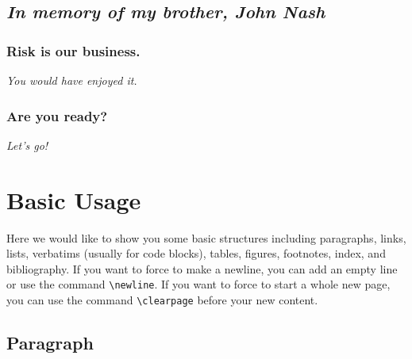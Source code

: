 \documentclass[10pt, a4paper, oneside]{book}
\begin{document}
\puredocTitlepageDate{\today}
\puredocTitlepageMaketitle[left]
\setcounter{page}{2}

{
\pagestyle{empty}
\vspace*{1cm}
\section*{\centering \emph{In memory of my brother, John Nash}}
\subsection*{\centering Risk is our business.}

{\centering \emph{You would have enjoyed it.} \par}


\subsection*{\centering Are you ready?}

{\centering \emph{Let's go!} \par}


\clearpage
}

\setcounter{tocdepth}{3}
{ \hypersetup{hidelinks} \tableofcontents } \clearpage
{ \hypersetup{hidelinks} \listoftables } \clearpage
{ \hypersetup{hidelinks} \listoffigures } \clearpage

\chapter{Basic Usage}\label{basic-usage}

Here we would like to show you some basic structures
including paragraphs, links, lists, verbatims (usually for code blocks),
tables, figures, footnotes, index, and bibliography.
If you want to force to make a newline, you can add an empty line or use the command \texttt{\textbackslash{}newline}.
If you want to force to start a whole new page, you can use the command \texttt{\textbackslash{}clearpage} before your new content.

\section{\texorpdfstring{Paragraph \label{start-paragraph}}{Paragraph }}\label{paragraph}
\end{document}
